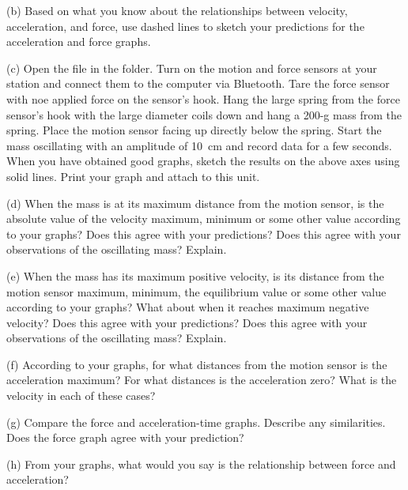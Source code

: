 (b) Based on what you know about the relationships between velocity, 
acceleration, and force, use dashed lines to sketch your predictions for the 
acceleration and force graphs.


(c) Open the file  in the \filename{\coursefolder} folder. Turn on the motion and force sensors at your station and connect them to the computer via Bluetooth. Tare the force sensor with noe applied force on the sensor's hook. Hang the large spring from the force sensor's hook with the large diameter coils down and hang a 200-g mass from the spring.  Place the motion sensor facing up directly below the spring. Start the mass oscillating with an amplitude of 10~cm and record data for a few seconds. When you have obtained good graphs, sketch the results on the above axes using solid lines. Print your graph and attach to this unit.

(d) When the mass is at its maximum distance from the motion sensor, is the absolute value of the velocity maximum, minimum or some other value according to your graphs? Does this agree
with your predictions? Does this agree with your observations of the oscillating
mass? Explain.
\answerspace{15mm}

\pagebreak[2]
(e) When the mass has its maximum positive velocity, is its distance from the
motion sensor maximum, minimum, the equilibrium value or some other value according
to your graphs? What about when it reaches maximum negative velocity? Does this
agree with your predictions? Does this agree with your observations of the 
oscillating mass? Explain. 
\answerspace{10mm}

(f) According to your graphs, for what distances from the motion sensor is the 
acceleration maximum? For what distances is the acceleration zero? What is the 
velocity in each of these cases?
\answerspace{20mm}

(g) Compare the force and acceleration-time graphs. Describe any similarities.
Does the force graph agree with your prediction?
\answerspace{20mm}

(h) From your graphs, what would you say is the relationship between force and
acceleration? 
\answerspace{20mm}

